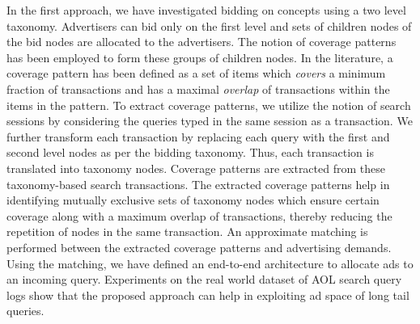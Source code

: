 In the first approach, we have investigated bidding on concepts using a two level taxonomy.  Advertisers can bid only on the first level and sets of children nodes of the bid nodes are allocated to the advertisers. The notion of coverage patterns has been employed to form these groups of children nodes. In the literature, a coverage pattern has been defined as a set of items which \textit{covers} a minimum fraction of transactions and has a maximal \textit{overlap} of transactions within the items in the pattern. To extract coverage patterns, we utilize the notion of search sessions by considering the queries typed in the same session as a transaction. We further transform each transaction by replacing each query with the first and second level nodes as per the bidding taxonomy. Thus, each transaction is translated into taxonomy nodes. Coverage patterns are extracted from these taxonomy-based search transactions. The extracted coverage patterns help in identifying mutually exclusive sets of taxonomy nodes which ensure certain coverage along with a maximum overlap of transactions, thereby reducing the repetition of nodes in the same transaction. An approximate matching is performed between the extracted coverage patterns and advertising demands. Using the matching, we have defined an end-to-end architecture to allocate ads to an incoming query. Experiments on the real world dataset of AOL search query logs show that the proposed approach can help in exploiting ad space of long tail queries.

